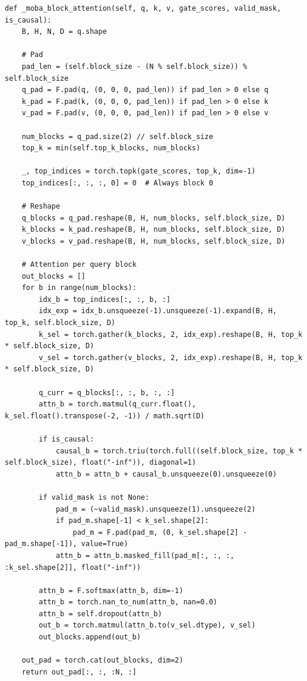 \begin{lstlisting}
def _moba_block_attention(self, q, k, v, gate_scores, valid_mask, is_causal):
    B, H, N, D = q.shape
    
    # Pad
    pad_len = (self.block_size - (N % self.block_size)) % self.block_size
    q_pad = F.pad(q, (0, 0, 0, pad_len)) if pad_len > 0 else q
    k_pad = F.pad(k, (0, 0, 0, pad_len)) if pad_len > 0 else k
    v_pad = F.pad(v, (0, 0, 0, pad_len)) if pad_len > 0 else v
    
    num_blocks = q_pad.size(2) // self.block_size
    top_k = min(self.top_k_blocks, num_blocks)
    
    _, top_indices = torch.topk(gate_scores, top_k, dim=-1)
    top_indices[:, :, :, 0] = 0  # Always block 0
    
    # Reshape
    q_blocks = q_pad.reshape(B, H, num_blocks, self.block_size, D)
    k_blocks = k_pad.reshape(B, H, num_blocks, self.block_size, D)
    v_blocks = v_pad.reshape(B, H, num_blocks, self.block_size, D)
    
    # Attention per query block
    out_blocks = []
    for b in range(num_blocks):
        idx_b = top_indices[:, :, b, :]
        idx_exp = idx_b.unsqueeze(-1).unsqueeze(-1).expand(B, H, top_k, self.block_size, D)
        k_sel = torch.gather(k_blocks, 2, idx_exp).reshape(B, H, top_k * self.block_size, D)
        v_sel = torch.gather(v_blocks, 2, idx_exp).reshape(B, H, top_k * self.block_size, D)
        
        q_curr = q_blocks[:, :, b, :, :]
        attn_b = torch.matmul(q_curr.float(), k_sel.float().transpose(-2, -1)) / math.sqrt(D)
        
        if is_causal:
            causal_b = torch.triu(torch.full((self.block_size, top_k * self.block_size), float("-inf")), diagonal=1)
            attn_b = attn_b + causal_b.unsqueeze(0).unsqueeze(0)
        
        if valid_mask is not None:
            pad_m = (~valid_mask).unsqueeze(1).unsqueeze(2)
            if pad_m.shape[-1] < k_sel.shape[2]:
                pad_m = F.pad(pad_m, (0, k_sel.shape[2] - pad_m.shape[-1]), value=True)
            attn_b = attn_b.masked_fill(pad_m[:, :, :, :k_sel.shape[2]], float("-inf"))
        
        attn_b = F.softmax(attn_b, dim=-1)
        attn_b = torch.nan_to_num(attn_b, nan=0.0)
        attn_b = self.dropout(attn_b)
        out_b = torch.matmul(attn_b.to(v_sel.dtype), v_sel)
        out_blocks.append(out_b)
    
    out_pad = torch.cat(out_blocks, dim=2)
    return out_pad[:, :, :N, :]
\end{lstlisting}

